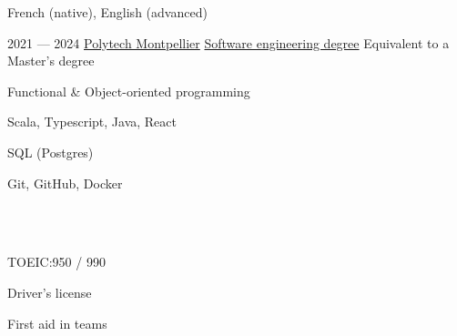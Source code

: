 \begin{SideBar}{\ColorBackground}{\ColorTextSide}

  \vspace{0.25cm}
  French (native), English (advanced)
  \vspace{0.5cm}

  \ExperienceSmall%
  {2021 --- 2024}%
  {\href{https://english.polytech.umontpellier.fr/}{Polytech Montpellier}}%
  {\href{https://www.polytech.umontpellier.fr/images/ecole/Plaquettes/SPECIALITE_IG_2018_EN.pdf}{Software engineering degree}}%
  {Equivalent to a Master's degree}

  \begin{ItemList}{\ColorHighlight}
    \item[\faBrain] Functional \& Object-oriented programming
    \item[\faLaptopCode] Scala, Typescript, Java, React
    \item[\faDatabase] SQL (Postgres)
    \item[\faTools] Git, GitHub, Docker
  \end{ItemList}

  \vspace{0.5\baselineskip}

  \\
  \vspace{0.25cm}
  \\
  \vspace{0.25cm}
  \vspace{0.5cm}

  \begin{ItemList}{\ColorHighlight}
    \item[\ding{72}] TOEIC:\@ 950 / 990
    \item[\ding{72}] Driver's license
    \item[\ding{72}] First aid in teams
  \end{ItemList}
  \vspace{0.5cm}


\end{SideBar}
